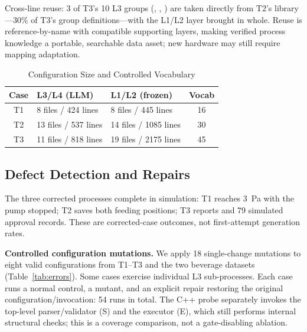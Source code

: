\documentclass[conference]{IEEEtran}
\begin{document}
Cross-line reuse: 3 of T3's 10 L3 groups (, , ) are taken directly from T2's library---30\% of T3's group definitions---with the L1/L2 layer brought in whole. Reuse is reference-by-name with compatible supporting layers, making verified process knowledge a portable, searchable data asset; new hardware may still require mapping adaptation.

\begin{table}[t]
\caption{Configuration Size and Controlled Vocabulary}
\label{tab:size}
\centering
\small
\begin{tabular}{|c|P{2.7cm}|P{2.7cm}|c|}
\hline
\textbf{Case} & \textbf{L3/L4 (LLM)} & \textbf{L1/L2 (frozen)} & \textbf{Vocab}\\
\hline
T1 & 8 files / 424 lines & 8 files / 445 lines & 16\\
\hline
T2 & 13 files / 537 lines & 14 files / 1085 lines & 30\\
\hline
T3 & 11 files / 818 lines & 19 files / 2175 lines & 45\\
\hline
\end{tabular}
\end{table}

\subsection{Defect Detection and Repairs}

The three corrected processes complete in simulation: T1 reaches 3~Pa with the pump stopped; T2 saves both feeding positions; T3 reports  and 79 simulated approval records. These are corrected-case outcomes, not first-attempt generation rates.

\textbf{Controlled configuration mutations.} We apply 18 single-change mutations to eight valid configurations from T1--T3 and the two beverage datasets (Table~\ref{tab:errors}). Some cases exercise individual L3 sub-processes. Each case runs a normal control, a mutant, and an explicit repair restoring the original configuration/invocation: 54 runs in total. The C++ probe separately invokes the top-level parser/validator (S) and the executor (E), which still performs internal structural checks; this is a coverage comparison, not a gate-disabling ablation.
\end{document}
